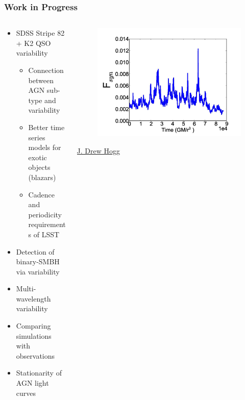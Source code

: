 \documentclass[hyperref={pdfpagelabels=false}]{beamer}
\begin{document}
\begin{frame}
\frametitle{Work in Progress}
  \begin{columns}
    \centering
    \begin{column}{0.6\textwidth}
      \begin{itemize}
        \item SDSS Stripe 82 + K2 QSO variability
        \begin{itemize}
          \item Connection between AGN sub-type and variability
          \item Better time series models for exotic objects (blazars)
          \item Cadence and periodicity requirements of LSST
        \end{itemize}
        \item Detection of binary-SMBH via variability
        \item Multi-wavelength variability
        \item Comparing simulations with observations
        \item Stationarity of AGN light curves
      \end{itemize}
    \end{column}
    \begin{column}{0.4\textwidth}
        \begin{figure}
          \includegraphics[scale=0.25]{images/Hogg_lc.jpg}
        \end{figure}
        \begin{center}
          \href{https://www.astro.umd.edu/people/drewhogg.html}{{\tiny J. Drew Hogg}}
        \end{center}
    \end{column}
  \end{columns}
\end{frame}
\end{document}
